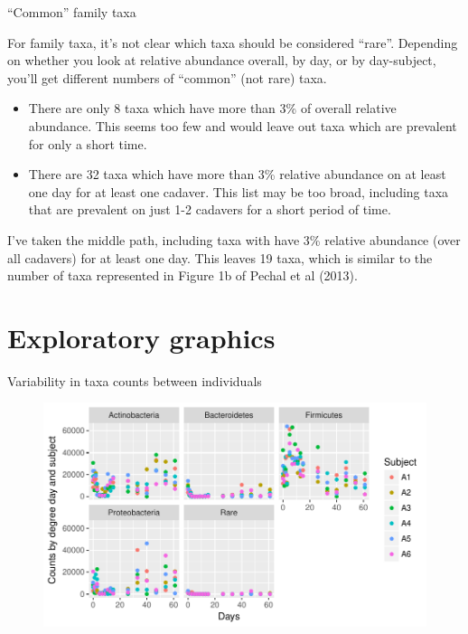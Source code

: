 \documentclass{beamer}
\begin{document}
\begin{frame}{``Common'' family taxa}

\noindent For family taxa, it's not clear which taxa should be
considered ``rare''.  Depending on whether you look at relative
abundance overall, by day, or by day-subject, you'll get different
numbers of ``common'' (not rare) taxa.
  
\begin{itemize}
\item There are only 8 taxa which have more than 3\% of overall relative abundance.  This seems too few and would leave out taxa which are prevalent for only a short time.
\item There are 32 taxa which have more than 3\% relative abundance on at least one day for at least one cadaver.  This list may be too broad, including taxa that are prevalent on just 1-2 cadavers for a short period of time.
\end{itemize}

\vspace{0.05in}

\noindent I've taken the middle path, including taxa with have 3\%
relative abundance (over all cadavers) for at least one day.  This
leaves 19 taxa, which is similar to the number of taxa represented in
Figure 1b of Pechal et al (2013).

\end{frame}




\section[Graphics]{Exploratory graphics}

\begin{frame}{Variability in taxa counts between individuals}

\begin{center}
\begin{figure}
  \includegraphics[width=4.5in]{phyla_scatter_counts_by_day_bacteria}
\end{figure}
\end{center}
\vspace{-0.05in}

\end{frame}
\end{document}
